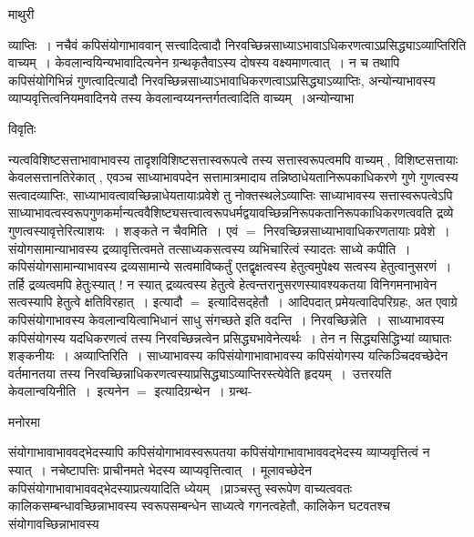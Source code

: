 \documentclass[10pt, openany]{book}
\begin{document}
{\newpage
\begin{center}  माथुरी  \end{center}
{\la व्याप्तिः~। नचैवं कपिसंयोगाभाववान् सत्त्वादित्वादौ निरवच्छिन्नसाध्याऽभावाऽधिकरणत्वाऽप्रसिद्ध्याऽव्याप्तिरिति वाच्यम्~। केवलान्वयिन्यभावादित्यनेन ग्रन्थकृतैवाऽस्य दोषस्य वक्ष्यमाणत्वात्~। न च तथापि कपिसंयोगिभिन्नं गुणत्वादित्यादौ निरवच्छिन्नसाध्याऽभावाधिकरणत्वाऽप्रसिद्ध्याऽव्याप्तिः, अन्योन्याभावस्य व्याप्यवृत्तित्वनियमवादिनये तस्य केवलान्वय्यनन्तर्गतत्वादिति वाच्यम्~।अन्योन्याभा}
\begin{center}     विवृतिः \end{center}

न्यत्वविशिष्टसत्ताभावाभावस्य तादृशविशिष्टसत्तास्वरूपत्वे तस्य सत्तास्वरूपत्वमपि वाच्यम् , विशिष्टसत्तायाः केवलसत्तानतिरेकात् , एवञ्च साध्याभावपदेन सत्तामात्रमादाय तन्निष्ठाधेयतानिरूपकाधिकरणे गुणे गुणत्वस्य सत्वादव्याप्तिः, साध्याभावत्वावच्छिन्नाधेयतायाःप्रवेशे तु नोक्तस्थलेऽव्याप्तिः साध्याभावस्य सत्तास्वरूपत्वेऽपि
साध्याभावत्वस्वरूपगुणकर्मान्यत्ववैशिष्ट्यसत्त्वात्वरूपधर्मद्वयावच्छिन्ननिरूपकतानिरूपकाधिकरणत्ववति द्रव्ये गुणत्वस्यावृत्तेरित्याशयः~। शङ्कते न {\la चैवमिति~।} एवं $=$ निरवच्छिन्नसाध्याभावाधिकरणतायाः प्रवेशे~। संयोगसामान्याभावस्य द्रव्यावृत्तित्वमते तत्साध्यकसत्वस्य व्यभिचारित्वं स्यादतः साध्ये {\la कपीति~।} कपिसंयोगसामान्याभावस्य द्रव्यसामान्ये सत्वमाविष्कर्तुं एतद्वृक्षत्वस्य हेतुत्वमुपेक्ष्य सत्वस्य हेतुत्वानुसरणं~। तर्हि द्रव्यत्वमपि हेतुःस्यात् ! न स्यात् द्रव्यत्वस्य हेतुत्वे हेत्वन्तरानुसरणस्यावश्यकतया विनिगमनाभावेन सत्वस्यापि हेतुत्वे क्षतिविरहात्~। इत्यादौ $=$ इत्यादिसद्हेतौ~। आदिपदात् प्रमेयत्वादिपरिग्रहः, अत एवाग्रे कपिसंयोगाभावस्य केवलान्वयित्वाभिधानं साधु संगच्छते इति वदन्ति~। {\qt निरवच्छिन्नेति~}।~साध्याभावस्य कपिसंयोगस्य यदधिकरणत्वं तस्य निरवच्छिन्नत्वेन प्रसिद्ध्यभावेनेत्यर्थः~। तेन न सिद्ध्यसिद्धिभ्यां व्याघातः शङ्कनीयः~। {\la अव्याप्तिरिति~।} साध्याभावस्य कपिसंयोगाभावाभावस्य कपिसंयोगस्य यत्किञ्चिदवच्छेदेन वर्तमानतया तस्य निरवच्छिन्नाधिकरणत्वस्याप्रसिद्ध्याऽव्याप्तिरस्त्येवेति हृदयम्~।~उत्तरयति {\la केवलान्वयिनीति~।}~इत्यनेन $=$ इत्यादिग्रन्थेन~। ग्रन्थ-
\begin{center}   मनोरमा  \end{center}
संयोगाभावाभाववद्भेदस्यापि कपिसंयोगाभावस्वरूपतया कपिसंयोगाभावाभाववद्भेदस्य व्याप्यवृत्तित्वं न स्यात्~। नचेष्टापत्तिः प्राचीनमते भेदस्य व्याप्यवृत्तित्वात्~। मूलावच्छेदेन कपिसंयोगाभावाभाववद्भेदस्याप्रत्ययादिति ध्येयम्~।प्राञ्चस्तु स्वरूपेण वाच्यत्ववतः कालिकसम्बन्धावच्छिन्नाभावस्य स्वरूपसम्बन्धेन साध्यत्वे गगनत्वहेतौ, कालिकेन घटवतश्च
संयोगावच्छिन्नाभावस्य
\newpage
}
\end{document}
